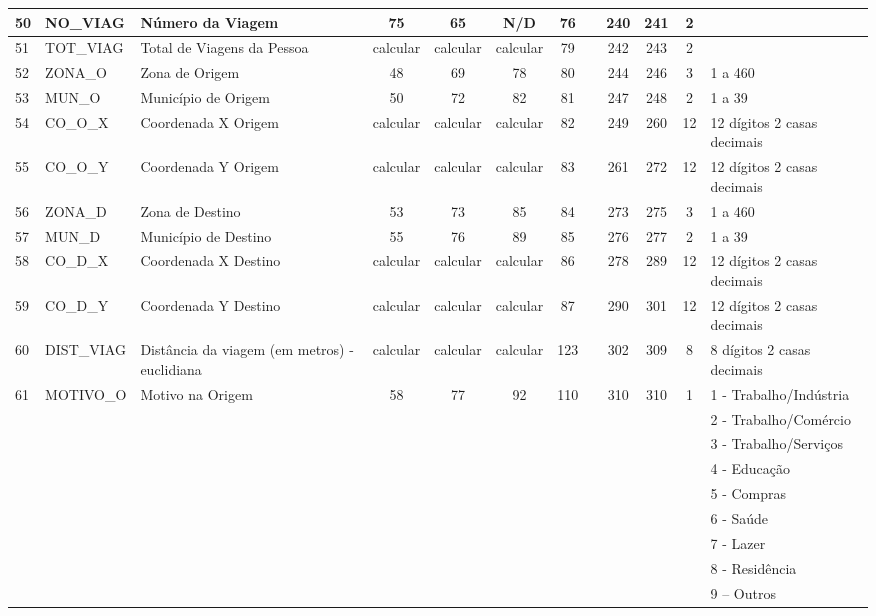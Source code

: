 \begin{table}[htbp]
\begin{center}
\begin{tabular}{|p{1cm}|l|l|c|c|c|c|c|c|c|c|l|}
50 & NO\_VIAG & Número da Viagem & 75 & 65 & N/D & 76 &  & 240 & 241 & 2 &  \\ \hline
51 & TOT\_VIAG & Total de Viagens da Pessoa & calcular & calcular & calcular & 79 &  & 242 & 243 & 2 &  \\ \hline
52 & ZONA\_O & Zona de Origem & 48 & 69 & 78 & 80 &  & 244 & 246 & 3 & 1 a 460 \\ \hline
53 & MUN\_O & Município de Origem & 50 & 72 & 82 & 81 &  & 247 & 248 & 2 & 1 a 39 \\ \hline
54 & CO\_O\_X & Coordenada X Origem & calcular & calcular & calcular & 82 &  & 249 & 260 & 12 & 12 dígitos 2 casas decimais \\ \hline
55 & CO\_O\_Y & Coordenada Y Origem & calcular & calcular & calcular & 83 &  & 261 & 272 & 12 & 12 dígitos 2 casas decimais \\ \hline
56 & ZONA\_D & Zona de Destino & 53 & 73 & 85 & 84 &  & 273 & 275 & 3 & 1 a 460 \\ \hline
57 & MUN\_D & Município de Destino & 55 & 76 & 89 & 85 &  & 276 & 277 & 2 & 1 a 39 \\ \hline
58 & CO\_D\_X & Coordenada X Destino & calcular & calcular & calcular & 86 &  & 278 & 289 & 12 & 12 dígitos 2 casas decimais \\ \hline
59 & CO\_D\_Y & Coordenada Y Destino & calcular & calcular & calcular & 87 &  & 290 & 301 & 12 & 12 dígitos 2 casas decimais \\ \hline
60 & DIST\_VIAG & Distância da viagem (em metros) - euclidiana & calcular & calcular & calcular & 123 &  & 302 & 309 & 8 & 8 dígitos 2 casas decimais \\ \hline
61 & MOTIVO\_O & Motivo na Origem & 58 & 77 & 92 & 110 &  & 310 & 310 & 1 & 1 - Trabalho/Indústria \\ \hline
 &  &  &  &  &  &  &  &  &  &  & 2 - Trabalho/Comércio \\ \hline
 &  &  &  &  &  &  &  &  &  &  & 3 - Trabalho/Serviços \\ \hline
 &  &  &  &  &  &  &  &  &  &  & 4 - Educação \\ \hline
 &  &  &  &  &  &  &  &  &  &  & 5 - Compras \\ \hline
 &  &  &  &  &  &  &  &  &  &  & 6 - Saúde \\ \hline
 &  &  &  &  &  &  &  &  &  &  & 7 - Lazer \\ \hline
 &  &  &  &  &  &  &  &  &  &  & 8 - Residência \\ \hline
 &  &  &  &  &  &  &  &  &  &  & 9 – Outros \\ \hline

\end{tabular}
\end{center}
\end{table}
